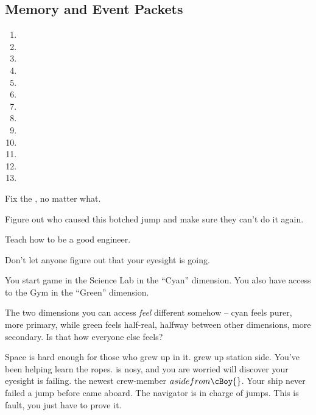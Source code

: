 \documentclass[char]{TMFHope}
\begin{document}
\subsection*{Memory and Event Packets}
\begin{enumerate}
	\item \mPractice{\MYname}
	\item \mEAlpha{\MYname}
	\item \mEngineerOne{\MYname}
	\item \mRepairsOne{\MYname}
	\item \mRepairsThree{\MYname}
	\item \mRepairsFive{\MYname}
	\item \mBroom{\MYname}
	\item \mLab{\MYname}
	\item \mPatient{\MYname}
	\item \mKitchen{\MYname}
	\item \mWeight{\MYname}
	\item \mTheater{\MYname}
	\item \mCrates{\MYname}
\end{enumerate}

\begin{itemz}[Goals]
	\item Fix the \pNew{}, no matter what.
	\item Figure out who caused this botched jump and make sure they can't do it again.
	\item Teach \cBoy{} how to be a good engineer.
	\item Don't let anyone figure out that your eyesight is going.
\end{itemz}

\begin{itemz}[Notes]
	\item You start game in the Science Lab in the ``Cyan'' dimension. You also have access to the Gym  in the ``Green'' dimension.
	\item The two dimensions you can access {\em feel} different somehow -- cyan feels purer, more primary, while green feels half-real, halfway between other dimensions, more secondary.  Is that how everyone else feels?
\end{itemz}

\begin{contacts}
	\contact{\cBoy{}} Space is hard enough for those who grew up in it. \cBoy{} grew up station side. You've been helping \cBoy{\them} learn the ropes.
	\contact{\cWeap{}} \cWeap{} is nosy, and you are worried \cWeap{\they} will discover your eyesight is failing.
	\contact{\cNav{}} \cNav{\They} \cNav{\are} the newest crew-member \(aside from \cBoy{}\). Your ship never failed a jump before \cNav{\they} came aboard. The navigator is in charge of jumps. This is \cNav{\their} fault, you just have to prove it.
\end{contacts}
\end{document}
